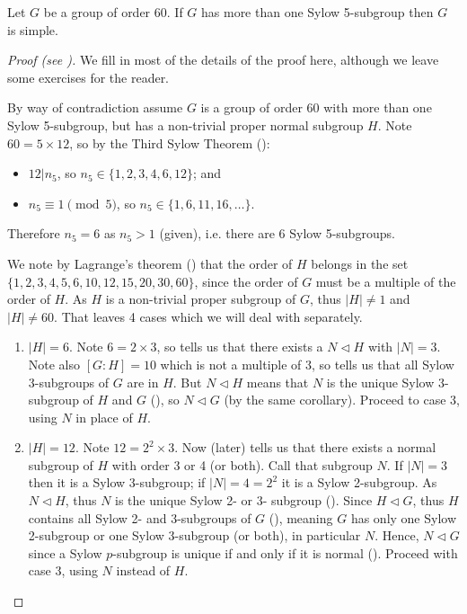 \begin{theorem}\label{thrm-group-of-order-60-with->1-sylow-5-subgroup-is-simple}
    Let $G$ be a group of order 60. If $G$ has more than one Sylow 5-subgroup then $G$ is simple.
\end{theorem}
\begin{proof}[Proof (see {\cite[Proposition 4.21]{dummit_foote_2004}})]
    We fill in most of the details of the proof here, although we leave some exercises for the reader.

    By way of contradiction assume $G$ is a group of order 60 with more than one Sylow 5-subgroup, but has a non-trivial proper normal subgroup $H$. Note $60 = 5 \times 12$, so by the Third Sylow Theorem ():
    \begin{itemize}
        \item $12 \vert n_5$, so $n_5 \in \{1, 2, 3, 4, 6, 12\}$; and
        \item $n_5 \equiv 1 \pmod 5$, so $n_5 \in \{1, 6, 11, 16, \dots\}$.
    \end{itemize}
    Therefore $n_5 = 6$ as $n_5 > 1$ (given), i.e. there are 6 Sylow 5-subgroups.

    We note by Lagrange's theorem () that the order of $H$ belongs in the set $\{1, 2, 3, 4, 5, 6, 10, 12, 15, 20, 30, 60\}$, since the order of $G$ must be a multiple of the order of $H$. As $H$ is a non-trivial proper subgroup of $G$, thus $|H| \neq 1$ and $|H| \neq 60$. That leaves 4 cases which we will deal with separately.
    \begin{enumerate}
        \item $|H| = 6$. Note $6 = 2 \times 3$, so  tells us that there exists a $N \lhd H$ with $|N| = 3$. Note also $[G:H] = 10$ which is not a multiple of 3, so  tells us that all Sylow 3-subgroups of $G$ are in $H$. But $N \lhd H$ means that $N$ is the unique Sylow 3-subgroup of $H$ and $G$ (), so $N \lhd G$ (by the same corollary). Proceed to case 3, using $N$ in place of $H$.
        
        \item $|H| = 12$. Note $12 = 2^2 \times 3$. Now  (later) tells us that there exists a normal subgroup of $H$ with order 3 or 4 (or both). Call that subgroup $N$. If $|N| = 3$ then it is a Sylow 3-subgroup; if $|N| = 4 = 2^2$ it is a Sylow 2-subgroup. As $N \lhd H$, thus $N$ is the unique Sylow 2- or 3- subgroup (). Since $H \lhd G$, thus $H$ contains all Sylow 2- and 3-subgroups of $G$ (), meaning $G$ has only one Sylow 2-subgroup or one Sylow 3-subgroup (or both), in particular $N$. Hence, $N \lhd G$ since a Sylow $p$-subgroup is unique if and only if it is normal (). Proceed with case 3, using $N$ instead of $H$.
        

\end{enumerate}
\end{proof}
